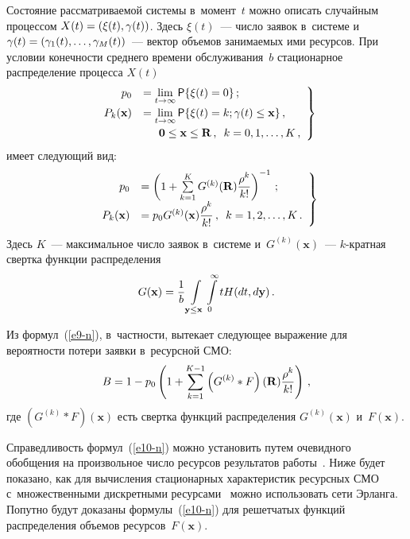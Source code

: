 \begin{multicols}{2}
  Состояние рассматриваемой системы в~момент~$t$ можно описать 
случайным процессом $X(t)\hm= (\xi(t),\gamma(t))$. Здесь $\xi(t)$~--- число 
заявок в~системе и~$\gamma(t)\hm= (\gamma_1(t), \ldots , \gamma_M(t))$~--- 
вектор объемов занимаемых ими ресурсов. При условии конечности среднего 
времени обслуживания~$b$ стационарное распределение процесса $X(t)$ 
  \begin{equation}
  \left.
  \begin{array}{rl}
  p_0 &=\lim\limits_{t\to\infty} {\sf P}\{ \xi(t)=0\}\,;\\[6pt] 
  P_k(\mathbf{x}) 
&=\lim\limits_{t\to\infty} {\sf P}\{ \xi(t)=k; \gamma(t)\leq \mathbf{x}\}\,,\\[6pt]
& \hspace*{5mm}\mathbf{0}\leq  \mathbf{x} \leq \mathbf{R}\,,\enskip
 k=0,1,\ldots ,K\,,
\end{array}
\right\}
  \label{e9-n}
\end{equation}
имеет следующий вид:
\begin{equation}
\left.
\begin{array}{rl}
p_0 &=\left( 1+\sum\limits_{k=1}^K G^{(k)} (\mathbf{R}) \displaystyle\frac{\displaystyle \rho^k\mathstrut}{\displaystyle k!\mathstrut}  
\right)^{-1}\,;\\[6pt]
P_k(\mathbf{x}) &=p_0 G^{(k)} (\mathbf{x}) \displaystyle\frac{\displaystyle \rho^k\mathstrut}{\displaystyle k!\mathstrut}\,,\enskip k=1, 2,\ldots, 
K\,.
\end{array}
\right\}
\label{e10-n}
\end{equation}
Здесь $K$~--- максимальное число заявок в~системе и~$G^{(k)}(\mathbf{x})$~--- 
$k$-крат\-ная свертка функции распределения
\begin{equation}
G(\mathbf{x}) = \displaystyle\frac{\displaystyle 1\mathstrut}{\displaystyle b\mathstrut}\int\limits_{\mathbf{y}\leq \mathbf{x}} 
\int\limits_0^\infty  tH(dt, d\mathbf{y})\,.
\label{e11-n}
\end{equation}
  
  Из формул~(\ref{e9-n}), в~частности, вытекает сле\-ду\-ющее выражение для 
вероятности потери заявки в~ресурсной СМО:
  \begin{equation*}
  B=1-p_0 \left( 1+ \sum\limits_{k=1}^{K-1} \left( G^{(k)} * F\right)  (\mathbf{R}) 
\displaystyle\frac{\displaystyle \rho^k\mathstrut}{\displaystyle k!\mathstrut}\right)\,,
  \end{equation*}
где $(G^{(k)} * F)(\mathbf{x})$ есть свертка функций распределения 
$G^{(k)}(\mathbf{x})$ и~$F(\mathbf{x})$.
  
  Справедливость формул~(\ref{e10-n}) можно установить путем очевидного 
обобщения на произвольное чис\-ло ресурсов результатов работы~\cite{6-n}. 
Ниже будет показано, как для вычисления стационарных характеристик 
ресурсных СМО с~множественными дискретными ресурсами~\cite{2-n} можно 
использовать сети Эрланга. Попутно будут доказаны формулы~(\ref{e10-n}) 
для решетчатых функций распределения объемов ресурсов~$F(\mathbf{x})$.
  

\end{multicols}
